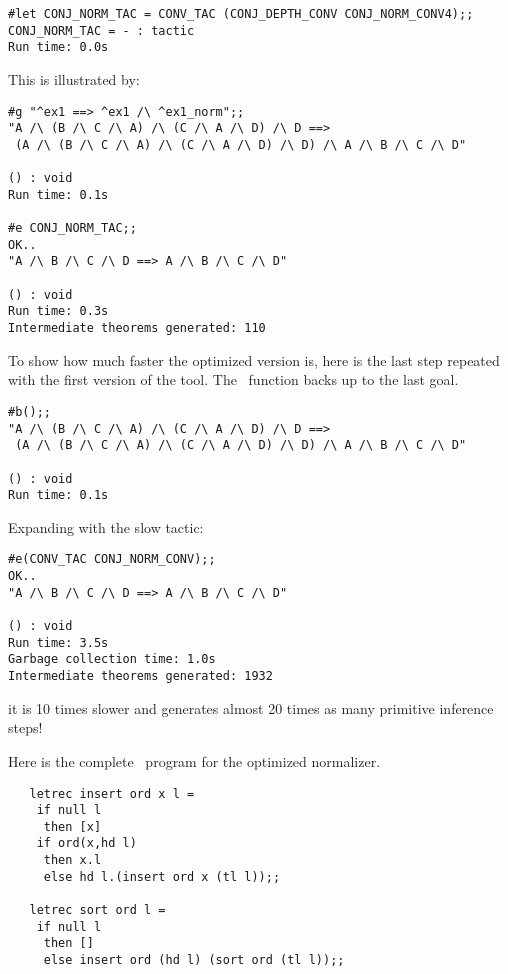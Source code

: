 \begin{session}\begin{verbatim}
#let CONJ_NORM_TAC = CONV_TAC (CONJ_DEPTH_CONV CONJ_NORM_CONV4);;
CONJ_NORM_TAC = - : tactic
Run time: 0.0s
\end{verbatim}\end{session}

\noindent This is illustrated by:

\begin{session}\begin{verbatim}
#g "^ex1 ==> ^ex1 /\ ^ex1_norm";;
"A /\ (B /\ C /\ A) /\ (C /\ A /\ D) /\ D ==>
 (A /\ (B /\ C /\ A) /\ (C /\ A /\ D) /\ D) /\ A /\ B /\ C /\ D"

() : void
Run time: 0.1s

#e CONJ_NORM_TAC;;
OK..
"A /\ B /\ C /\ D ==> A /\ B /\ C /\ D"

() : void
Run time: 0.3s
Intermediate theorems generated: 110
\end{verbatim}\end{session}

\noindent To show how much faster the optimized version is, here is
the last step repeated with the first version of the tool. The \ML\
function  backs up to the last goal.

\begin{session}\begin{verbatim}
#b();;
"A /\ (B /\ C /\ A) /\ (C /\ A /\ D) /\ D ==>
 (A /\ (B /\ C /\ A) /\ (C /\ A /\ D) /\ D) /\ A /\ B /\ C /\ D"

() : void
Run time: 0.1s
\end{verbatim}\end{session}

\noindent Expanding with the slow tactic:

\begin{session}\begin{verbatim}
#e(CONV_TAC CONJ_NORM_CONV);;
OK..
"A /\ B /\ C /\ D ==> A /\ B /\ C /\ D"

() : void
Run time: 3.5s
Garbage collection time: 1.0s
Intermediate theorems generated: 1932
\end{verbatim}\end{session}

\noindent it is 10 times slower and generates almost 20 times as many
primitive inference steps!


Here is the complete \ML\ program for the optimized normalizer.

\begin{hol}\begin{verbatim}
   letrec insert ord x l =
    if null l 
     then [x]
    if ord(x,hd l)
     then x.l
     else hd l.(insert ord x (tl l));;

   letrec sort ord l =
    if null l
     then []
     else insert ord (hd l) (sort ord (tl l));;
\end{verbatim}\end{hol}


